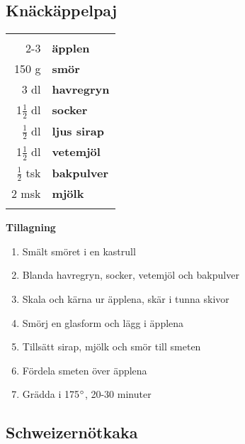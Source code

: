 \clearpage

\subsection{Knäckäppelpaj}

\begin{table}[H]
	\begin{tabular}{rl}
	\hline
	&\\
		2-3 & \textbf{äpplen}\\
		150 g & \textbf{smör}\\
		3 dl & \textbf{havregryn}\\
		1$\frac{1}{2}$ dl & \textbf{socker}\\
		$\frac{1}{2}$ dl & \textbf{ljus sirap}\\
		1$\frac{1}{2}$ dl & \textbf{vetemjöl}\\
		$\frac{1}{2}$ tsk & \textbf{bakpulver}\\
		2 msk & \textbf{mjölk}\\
	&\\
	\hline
	\end{tabular}
\end{table}


\begin{multicols*}{2}

\noindent \textbf{Tillagning}
\begin{enumerate}
	\itemsep0cm
	\item Smält smöret i en kastrull
	\item Blanda havregryn, socker, vetemjöl och bakpulver
	\item Skala och kärna ur äpplena, skär i tunna skivor
	\item Smörj en glasform och lägg i äpplena
	\item Tillsätt sirap, mjölk och smör till smeten
	\item Fördela smeten över äpplena
	\item Grädda i 175$\degree$, 20-30 \mbox{minuter}
\end{enumerate}

\end{multicols*}

\clearpage
\subsection{Schweizernötkaka}

